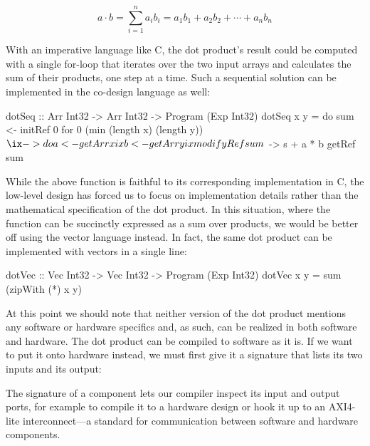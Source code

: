 \documentclass[../paper.tex]{subfiles}
\begin{document}
\begin{equation}
a \cdot b = \sum_{i=1}^{n}a_{i}b_{i} = a_{1}b_{1} + a_{2}b_{2} + \cdots + a_{n}b_{n}
\end{equation}

With an imperative language like C, the dot product's result could be computed with a single for-loop that iterates over the two input arrays and calculates the sum of their products, one step at a time. Such a sequential solution can be implemented in the co-design language as well:

\begin{code}
dotSeq :: Arr Int32 -> Arr Int32 -> Program (Exp Int32)
dotSeq x y = do
  sum <- initRef 0
  for 0 (min (length x) (length y)) $ \ix -> do
    a <- getArr x ix
    b <- getArr y ix
    modifyRef sum $ \s -> s + a * b
  getRef sum
\end{code}

While the above function is faithful to its corresponding implementation in C, the low-level design has forced us to focus on implementation details rather than the mathematical specification of the dot product. In this situation, where the function can be succinctly expressed as a sum over products, we would be better off using the vector language instead. In fact, the same dot product can be implemented with vectors in a single line:

\begin{code}
dotVec :: Vec Int32 -> Vec Int32 -> Program (Exp Int32)
dotVec x y = sum (zipWith (*) x y)
\end{code}

At this point we should note that neither version of the dot product mentions any software or hardware specifics and, as such, can be realized in both software and hardware. The dot product can be compiled to software as it is. If we want to put it onto hardware instead, we must first give it a signature that lists its two inputs and its output:


\noindent The signature of a component lets our compiler inspect its input and output ports, for example to compile it to a hardware design or hook it up to an AXI4-lite interconnect---a standard for communication between software and hardware components.
\end{document}
